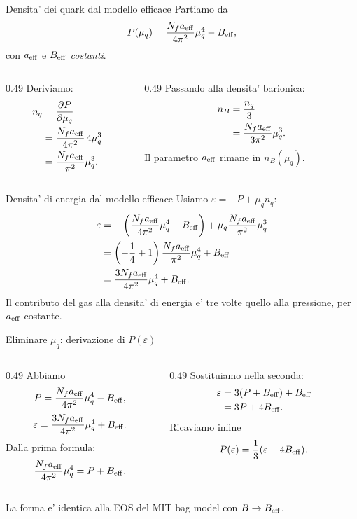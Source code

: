 \begin{frame}{Densita' dei quark dal modello efficace}
\small
Partiamo da
\[
P(\mu_q)=\frac{N_fa_{\rm eff}}{4\pi^2}\mu_q^4-B_{\rm eff},
\]
con $a_{\rm eff}$ e $B_{\rm eff}$ \emph{costanti}.
\begin{columns}[T,onlytextwidth]
\begin{column}{0.49\textwidth}
Deriviamo:
\[
\begin{aligned}
n_q&=\frac{\partial P}{\partial\mu_q}\\
&=\frac{N_fa_{\rm eff}}{4\pi^2}\,4\mu_q^3\\
&=\frac{N_fa_{\rm eff}}{\pi^2}\mu_q^3.
\end{aligned}
\]
\end{column}
\begin{column}{0.49\textwidth}
Passando alla densita' barionica:
\[
\begin{aligned}
n_B&=\frac{n_q}{3}\\
&=\frac{N_fa_{\rm eff}}{3\pi^2}\mu_q^3.
\end{aligned}
\]
Il parametro $a_{\rm eff}$ rimane
in $n_B(\mu_q)$.
\end{column}
\end{columns}
\end{frame}

\begin{frame}{Densita' di energia dal modello efficace}
\small
Usiamo $\varepsilon=-P+\mu_qn_q$:
\[
\begin{aligned}
\varepsilon
&=-\left(\frac{N_fa_{\rm eff}}{4\pi^2}\mu_q^4-B_{\rm eff}\right)
+\mu_q\frac{N_fa_{\rm eff}}{\pi^2}\mu_q^3\\
&=\left(-\frac14+1\right)
\frac{N_fa_{\rm eff}}{\pi^2}\mu_q^4+B_{\rm eff}\\
&=\frac{3N_fa_{\rm eff}}{4\pi^2}\mu_q^4+B_{\rm eff}.
\end{aligned}
\]
Il contributo del gas alla densita' di energia e' tre volte
quello alla pressione, per $a_{\rm eff}$ costante.
\end{frame}

\begin{frame}{Eliminare $\mu_q$: derivazione di $P(\varepsilon)$}
\small
\begin{columns}[T,onlytextwidth]
\begin{column}{0.49\textwidth}
Abbiamo
\[
P=\frac{N_fa_{\rm eff}}{4\pi^2}\mu_q^4-B_{\rm eff},
\]
\[
\varepsilon=
\frac{3N_fa_{\rm eff}}{4\pi^2}\mu_q^4+B_{\rm eff}.
\]
Dalla prima formula:
\[
\frac{N_fa_{\rm eff}}{4\pi^2}\mu_q^4
=P+B_{\rm eff}.
\]
\end{column}
\begin{column}{0.49\textwidth}
Sostituiamo nella seconda:
\[
\begin{aligned}
\varepsilon
&=3(P+B_{\rm eff})+B_{\rm eff}\\
&=3P+4B_{\rm eff}.
\end{aligned}
\]
Ricaviamo infine
\[
P(\varepsilon)
=\frac13(\varepsilon-4B_{\rm eff}).
\]
\end{column}
\end{columns}
\medskip
La forma e' identica alla EOS del MIT bag model con $B\to B_{\rm eff}$.
\end{frame}

